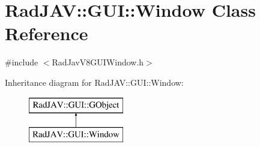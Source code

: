 \hypertarget{class_rad_j_a_v_1_1_g_u_i_1_1_window}{}\section{Rad\+J\+AV\+:\+:G\+UI\+:\+:Window Class Reference}
\label{class_rad_j_a_v_1_1_g_u_i_1_1_window}


{\ttfamily \#include $<$Rad\+Jav\+V8\+G\+U\+I\+Window.\+h$>$}

Inheritance diagram for Rad\+J\+AV\+:\+:G\+UI\+:\+:Window\+:\begin{figure}[H]
\begin{center}
\leavevmode
\includegraphics[height=2.000000cm]{class_rad_j_a_v_1_1_g_u_i_1_1_window}
\end{center}
\end{figure}
